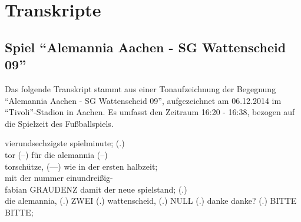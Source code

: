 \section{Transkripte}
\subsection{Spiel "`Alemannia Aachen - SG Wattenscheid 09"'}
Das folgende Transkript stammt aus einer Tonaufzeichnung der Begegnung "`Alemannia Aachen - SG Wattenscheid 09"', aufgezeichnet am 06.12.2014 im "`Tivoli"'-Stadion in Aachen. Es umfasst den Zeitraum 16:20 - 16:38, bezogen auf die Spielzeit des Fußballspiels.

\begin{dialogue}
	 vierundsechzigste spielminute; (.) \\
	tor (--) für die alemannia (--) \\
	torschütze, (---) wie in der ersten halbzeit; \\
	mit der nummer einundreißig- \\
	fabian
	 GRAUDENZ
	 damit der neue spielstand; (.) \\
	die alemannia, (.)
	 ZWEI (.)
	 wattenscheid, (.)
	 NULL (.)
	 danke danke? (.)
	 BITTE BITTE;
\end{dialogue}
